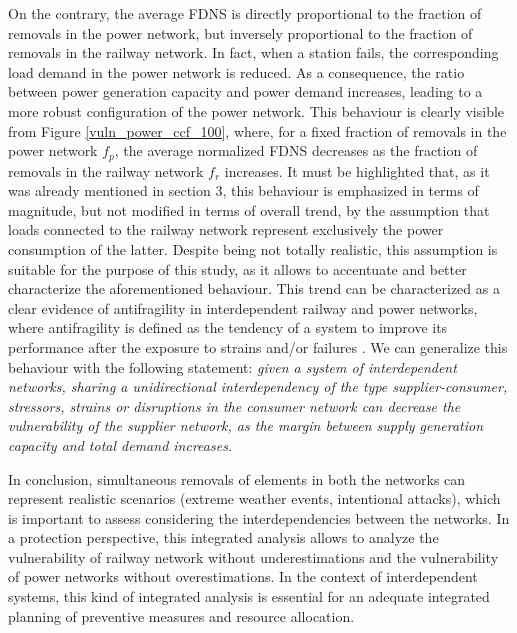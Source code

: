 \documentclass[review]{elsarticle}
\begin{document}
On the contrary, the average FDNS is directly proportional to the fraction of removals in the power network, but inversely proportional to the fraction of removals in the railway network. In fact, when a station fails, the corresponding load demand in the power network is reduced. As a consequence, the ratio between power generation capacity and power demand increases, leading to a more robust configuration of the power network. This behaviour is clearly visible from Figure \ref{vuln_power_ccf_100}, where, for a fixed fraction of removals in the power network $f_p$, the average normalized FDNS decreases as the fraction of removals in the railway network $f_r$ increases. It must be highlighted that, as it was already mentioned in section 3, this behaviour is emphasized in terms of magnitude, but not modified in terms of  overall trend, by the assumption that loads connected to the railway network represent exclusively the power consumption of the latter. Despite being not totally realistic, this assumption is suitable for the purpose of this study, as it allows to accentuate and better characterize the aforementioned behaviour. This trend can be characterized as a clear evidence of antifragility in interdependent railway and power networks, where antifragility is defined as the tendency of a system to improve its performance after the exposure to strains and/or failures \cite{fang2017emergence}. We can generalize this behaviour with the following statement: \textit{given a system of interdependent networks, sharing a unidirectional interdependency of the type supplier-consumer, stressors, strains or disruptions in the consumer network can decrease the vulnerability of the supplier network, as the margin between supply generation capacity and total demand increases.}


In conclusion, simultaneous removals of elements in both the networks can represent realistic scenarios (extreme weather events, intentional attacks), which is important to assess considering the interdependencies between the networks. In a protection perspective, this integrated analysis allows to analyze the vulnerability of railway network without underestimations and the vulnerability of power networks without overestimations. In the context of interdependent systems, this kind of integrated analysis is essential for an adequate integrated planning of preventive measures and resource allocation.
\end{document}
